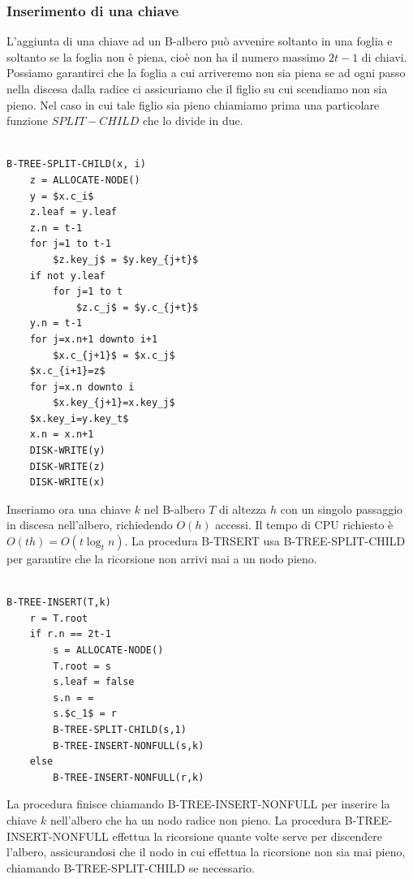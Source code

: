 \subsubsection{Inserimento di una chiave}

L'aggiunta di  una chiave ad un B-albero può avvenire soltanto in una foglia e soltanto se la foglia non è piena, cioè non ha il numero massimo $2t-1$ di chiavi. Possiamo garantirci che la foglia a cui arriveremo non sia piena se ad ogni passo nella discesa dalla radice ci assicuriamo che il figlio su cui scendiamo non sia pieno. Nel caso in cui tale figlio sia pieno chiamiamo prima una particolare funzione \textbf{$SPLIT-CHILD$} che lo divide in due.

\begin{lstlisting}[mathescape=true, caption=Procedura di divisione di un nodo]

B-TREE-SPLIT-CHILD(x, i)
	z = ALLOCATE-NODE()
	y = $x.c_i$
	z.leaf = y.leaf
	z.n = t-1
	for j=1 to t-1
		$z.key_j$ = $y.key_{j+t}$
	if not y.leaf
		for j=1 to t
			$z.c_j$ = $y.c_{j+t}$
	y.n = t-1
	for j=x.n+1 downto i+1
		$x.c_{j+1}$ = $x.c_j$
	$x.c_{i+1}=z$
	for j=x.n downto i
		$x.key_{j+1}=x.key_j$
	$x.key_i=y.key_t$
	x.n = x.n+1
	DISK-WRITE(y)
	DISK-WRITE(z)
	DISK-WRITE(x)

\end{lstlisting}

Inseriamo ora una chiave $k$ nel B-albero $T$ di altezza $h$ con un singolo passaggio in discesa nell'albero, richiedendo $O(h)$ accessi. Il tempo di CPU richiesto è $O(th)=O(t\log_tn)$. La procedura B-TRSERT usa B-TREE-SPLIT-CHILD per garantire che la ricorsione non arrivi mai a un nodo pieno.

\begin{lstlisting}[mathescape=true, caption=Inserimento di una chiave]

B-TREE-INSERT(T,k)
	r = T.root
	if r.n == 2t-1
		s = ALLOCATE-NODE()
		T.root = s
		s.leaf = false
		s.n = =
		s.$c_1$ = r
		B-TREE-SPLIT-CHILD(s,1)
		B-TREE-INSERT-NONFULL(s,k)
	else
		B-TREE-INSERT-NONFULL(r,k)

\end{lstlisting}

La procedura finisce chiamando B-TREE-INSERT-NONFULL per inserire la chiave $k$ nell'albero che ha un nodo radice non pieno. La procedura B-TREE-INSERT-NONFULL effettua la ricorsione quante volte serve per discendere l'albero, assicurandosi che il nodo in cui effettua la ricorsione non sia mai pieno, chiamando B-TREE-SPLIT-CHILD se necessario.

